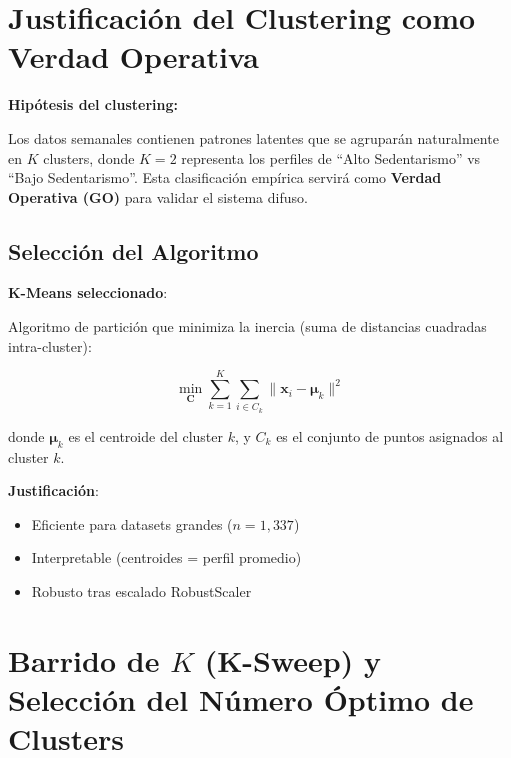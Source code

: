\documentclass[12pt,letterpaper,twoside]{report}
\newcommand{\vect}[1]{\boldsymbol{#1}}
\newcommand{\mat}[1]{\mathbf{#1}}
\begin{document}
\section{Justificación del Clustering como Verdad Operativa}

\begin{hipotesisbox}
\textbf{Hipótesis del clustering:}

Los datos semanales contienen patrones latentes que se agruparán naturalmente en $K$ clusters, donde $K=2$ representa los perfiles de ``Alto Sedentarismo'' vs ``Bajo Sedentarismo''. Esta clasificación empírica servirá como \textbf{Verdad Operativa (GO)} para validar el sistema difuso.
\end{hipotesisbox}

\subsection{Selección del Algoritmo}

\begin{estadisticobox}
\textbf{K-Means seleccionado}:

Algoritmo de partición que minimiza la inercia (suma de distancias cuadradas intra-cluster):

\begin{equation}
\min_{\mat{C}} \sum_{k=1}^{K} \sum_{i \in C_k} \|\vect{x}_i - \vect{\mu}_k\|^2
\end{equation}

donde $\vect{\mu}_k$ es el centroide del cluster $k$, y $C_k$ es el conjunto de puntos asignados al cluster $k$.

\textbf{Justificación}:
\begin{itemize}[noitemsep]
    \item Eficiente para datasets grandes ($n=1,337$)
    \item Interpretable (centroides = perfil promedio)
    \item Robusto tras escalado RobustScaler
\end{itemize}
\end{estadisticobox}

\section{Barrido de $K$ (K-Sweep) y Selección del Número Óptimo de Clusters}
\end{document}

